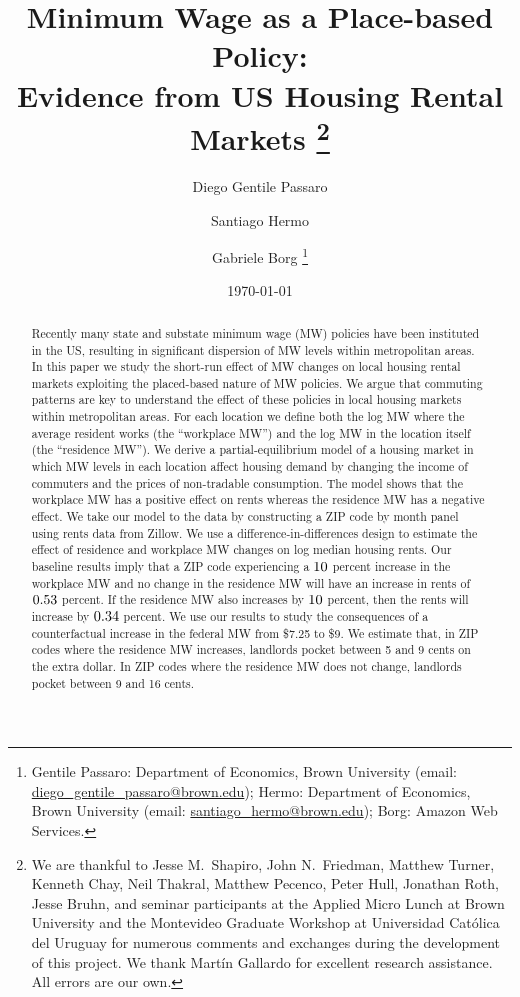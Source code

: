 \documentclass{article}
\title{ Minimum Wage as a Place-based Policy: \\
        Evidence from US Housing Rental Markets%
        \thanks{We are thankful to Jesse M.\ Shapiro, John N.\ Friedman, 
        Matthew Turner, Kenneth Chay, Neil Thakral, Matthew Pecenco, Peter Hull,
        Jonathan Roth, Jesse Bruhn, 
        and seminar participants at the Applied Micro Lunch at Brown
        University and the Montevideo Graduate Workshop at Universidad Católica 
        del Uruguay
        for numerous comments and exchanges during the development of 
        this project.
        We thank Martín Gallardo for excellent research assistance.
        All errors are our own.}}
\author{Diego Gentile Passaro \and Santiago Hermo \and Gabriele Borg
        \footnote{Gentile Passaro: Department of Economics, Brown University 
        (email: \url{diego_gentile_passaro@brown.edu}); 
        Hermo: Department of Economics, Brown University 
        (email: \url{santiago_hermo@brown.edu});
        Borg: Amazon Web Services.}}
\date{\today}
\begin{document}
\maketitle

\begin{abstract}
    \noindent
    Recently many state and substate minimum wage (MW) policies have been 
    instituted in the US, resulting in significant dispersion of MW levels 
    within metropolitan areas.
    In this paper we study the short-run effect of MW changes on local housing 
    rental markets exploiting the placed-based nature of MW policies.
    We argue that commuting patterns are key to understand the effect of these
    policies in local housing markets within metropolitan areas.
    For each location we define both
    the log MW where the average resident works (the ``workplace MW'')
    and the log MW in the location itself (the ``residence MW'').
    We derive a partial-equilibrium model of a housing market
    in which MW levels in each location affect housing demand by 
    changing the income of commuters and the prices of non-tradable consumption. 
    The model shows that the workplace MW has a positive effect on rents 
    whereas the residence MW has a negative effect.
    We take our model to the data by constructing a ZIP code by month panel 
    using rents data from Zillow.
    We use a difference-in-differences design to estimate the effect of 
    residence and workplace MW changes on log median housing rents.
    Our baseline results imply that a ZIP code experiencing a 
    $\textnormal{10}$ percent increase in the workplace MW and 
    no change in the residence MW will have an increase in rents of 
    $\textnormal{0.53}$ percent.
    If the residence MW also increases by $\textnormal{10}$ percent, then 
    the rents will increase by $\textnormal{0.34}$ percent.
    We use our results to study the consequences of a counterfactual increase in 
    the federal MW from \$7.25 to \$9.
    We estimate that, in ZIP codes where the residence MW increases, landlords 
    pocket between 5 and 9 cents on the extra dollar.
    In ZIP codes where the residence MW does not change, landlords pocket 
    between 9 and 16 cents.
\end{abstract}
\end{document}
